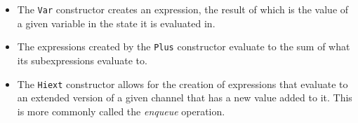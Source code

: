 \begin{itemize}
\begin{itemize}
        \item The \verb|Var| constructor creates an expression, the result of which is the value of a given variable in the state it is evaluated in.
        \begin{code}
            \>[4]\AgdaSpace{}%
            \AgdaSymbol{:}\AgdaSpace{}%
            \AgdaSymbol{(}\AgdaSpace{}%
            \AgdaSymbol{:}\AgdaSpace{}%
            \AgdaSymbol{)}\AgdaSpace{}%
            \AgdaSpace{}%
            \AgdaSpace{}%
            \AgdaSymbol{(}\AgdaSpace{}%
            \AgdaSymbol{)}\<%
        \end{code}
        
        \item The expressions created by the \verb|Plus| constructor evaluate to the sum of what its subexpressions evaluate to.
        \begin{code}
            \>[4]\AgdaSpace{}%
            \AgdaSymbol{:}\AgdaSpace{}%
            \AgdaSpace{}%
            \AgdaSpace{}%
            \AgdaSpace{}%
            \AgdaSpace{}%
            \AgdaSpace{}%
            \AgdaSpace{}%
            \AgdaSpace{}%
            \<%
        \end{code}
        
        \item The \verb|Hiext| constructor allows for the creation of expressions that evaluate to an extended version of a given channel that has a new value added to it. This is more commonly called the \textit{enqueue} operation.
        \begin{code}
            \>[4]\AgdaSpace{}%
            \AgdaSymbol{:}\AgdaSpace{}%
            \AgdaSymbol{\{}\AgdaSpace{}%
            \AgdaSymbol{:}\AgdaSpace{}%
            \AgdaSymbol{\}}\AgdaSpace{}%
            \<%
            \\
            \>[4][@{}l@{\AgdaIndent{0}}]%
            \>[6]\AgdaSpace{}%
            \AgdaSpace{}%
            \AgdaSpace{}%
            \AgdaSpace{}%
            \AgdaSymbol{(}\AgdaSpace{}%
            \AgdaSymbol{)}\AgdaSpace{}%
            \AgdaSpace{}%
            \AgdaSpace{}%
            \AgdaSymbol{(}\AgdaSpace{}%
            \AgdaSymbol{)}\<%
        \end{code}
        

\end{itemize}
\end{itemize}
